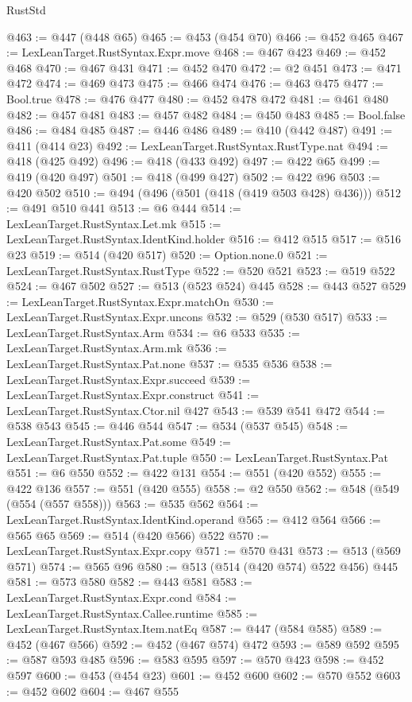 \begin{lexlean}{RustStd}
\begin{coremodule}
{\begin{coremodule}
{{{{{{{{{{{@463 := @447 (@448 @65)
@465 := @453 (@454 @70)
@466 := @452 @465
@467 := LexLeanTarget.RustSyntax.Expr.move
@468 := @467 @423
@469 := @452 @468
@470 := @467 @431
@471 := @452 @470
@472 := @2 @451
@473 := @471 @472
@474 := @469 @473
@475 := @466 @474
@476 := @463 @475
@477 := Bool.true
@478 := @476 @477
@480 := @452 @478 @472
@481 := @461 @480
@482 := @457 @481
@483 := @457 @482
@484 := @450 @483
@485 := Bool.false
@486 := @484 @485
@487 := @446 @486
@489 := @410 (@442 @487)
@491 := @411 (@414 @23)
@492 := LexLeanTarget.RustSyntax.RustType.nat
@494 := @418 (@425 @492)
@496 := @418 (@433 @492)
@497 := @422 @65
@499 := @419 (@420 @497)
@501 := @418 (@499 @427)
@502 := @422 @96
@503 := @420 @502
@510 := @494 (@496 (@501 (@418 (@419 @503 @428) @436)))
@512 := @491 @510 @441
@513 := @6 @444
@514 := LexLeanTarget.RustSyntax.Let.mk
@515 := LexLeanTarget.RustSyntax.IdentKind.holder
@516 := @412 @515
@517 := @516 @23
@519 := @514 (@420 @517)
@520 := Option.none.{0}
@521 := LexLeanTarget.RustSyntax.RustType
@522 := @520 @521
@523 := @519 @522
@524 := @467 @502
@527 := @513 (@523 @524) @445
@528 := @443 @527
@529 := LexLeanTarget.RustSyntax.Expr.matchOn
@530 := LexLeanTarget.RustSyntax.Expr.uncons
@532 := @529 (@530 @517)
@533 := LexLeanTarget.RustSyntax.Arm
@534 := @6 @533
@535 := LexLeanTarget.RustSyntax.Arm.mk
@536 := LexLeanTarget.RustSyntax.Pat.none
@537 := @535 @536
@538 := LexLeanTarget.RustSyntax.Expr.succeed
@539 := LexLeanTarget.RustSyntax.Expr.construct
@541 := LexLeanTarget.RustSyntax.Ctor.nil @427
@543 := @539 @541 @472
@544 := @538 @543
@545 := @446 @544
@547 := @534 (@537 @545)
@548 := LexLeanTarget.RustSyntax.Pat.some
@549 := LexLeanTarget.RustSyntax.Pat.tuple
@550 := LexLeanTarget.RustSyntax.Pat
@551 := @6 @550
@552 := @422 @131
@554 := @551 (@420 @552)
@555 := @422 @136
@557 := @551 (@420 @555)
@558 := @2 @550
@562 := @548 (@549 (@554 (@557 @558)))
@563 := @535 @562
@564 := LexLeanTarget.RustSyntax.IdentKind.operand
@565 := @412 @564
@566 := @565 @65
@569 := @514 (@420 @566) @522
@570 := LexLeanTarget.RustSyntax.Expr.copy
@571 := @570 @431
@573 := @513 (@569 @571)
@574 := @565 @96
@580 := @513 (@514 (@420 @574) @522 @456) @445
@581 := @573 @580
@582 := @443 @581
@583 := LexLeanTarget.RustSyntax.Expr.cond
@584 := LexLeanTarget.RustSyntax.Callee.runtime
@585 := LexLeanTarget.RustSyntax.Item.natEq
@587 := @447 (@584 @585)
@589 := @452 (@467 @566)
@592 := @452 (@467 @574) @472
@593 := @589 @592
@595 := @587 @593 @485
@596 := @583 @595
@597 := @570 @423
@598 := @452 @597
@600 := @453 (@454 @23)
@601 := @452 @600
@602 := @570 @552
@603 := @452 @602
@604 := @467 @555
}}}}}}}}}}}
\end{coremodule}}
\end{coremodule}
\end{lexlean}
